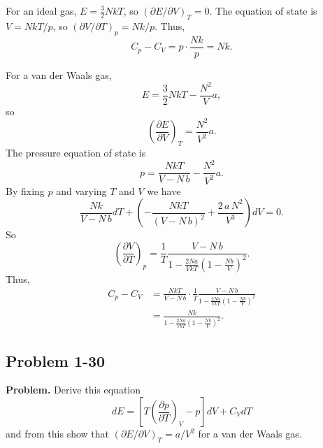 \documentclass[twocolumn, 10pt]{article}
\numberwithin{equation}{section}
\newenvironment{problem}
{\par\medskip \color{problemblue}
  \textbf{Problem. }\ignorespaces}
{\medskip}
\newenvironment{solution}[1][\empty]
{\par\medskip\sffamily
  \textbf{\ifx\empty#1{Solution.}\relax\else{#1}\fi} \ignorespaces}
{\medskip}
\begin{document}
\begin{solution}
For an ideal gas,
$E = \frac 3 2 N k T$,
so
$( \partial E / \partial V )_T = 0$.
The equation of state is
$V = NkT/p$,
so $(\partial V/\partial T)_p = Nk/p$.
Thus,
$$
C_p - C_V = p \cdot \frac{Nk}{p} = N k.
$$

For a van der Waals gas,
$$
E = \frac{3}{2} N k T  - \frac{ N^2 } { V } a,
$$
so
$$
\left( \frac{ \partial E } {\partial V } \right)_T = \frac{ N^2 } { V^2 } a.
$$
The pressure equation of state is
$$
p = \frac{ N k T } { V - N \, b } - \frac{N^2 }{ V^2 } a.
$$
By fixing $p$ and varying $T$ and $V$ we have
$$
\frac{ N k } { V - N \, b } dT
+
\left(
- \frac{ N k T } { (V - N \, b)^2 }
+ \frac{ 2 \, a \, N^2 } { V^3 } \right) dV = 0.
$$
So
$$
\left(
\frac{ \partial V } { \partial T }
\right)_p
=
\frac{1}{T} \frac{ V - N \, b }
{1 - \frac{ 2 N a }{ V k T } \left(1 - \frac{N b}{V} \right)^2 }
.
$$
Thus,
\begin{align*}
C_p - C_V
  &=
\frac{ N k T } { V - N \, b } \cdot
\frac{1}{T} \frac{ V - N \, b }
{1 - \frac{ 2 N a }{ V k T } \left(1 - \frac{N b}{V} \right)^2 }
  \\
  &=
\frac{ N k }
{1 - \frac{ 2 N a }{ V k T } \left(1 - \frac{N b}{V} \right)^2 }
.
\end{align*}

\end{solution}




\subsection{Problem 1-30}

\begin{problem}
  Derive this equation
  \begin{equation}
  dE
  =
  \left[ T \left( \frac{ \partial p} {\partial T } \right)_V - p \right]
  dV + C_V dT
    \label{eq:dE_VT}
  \end{equation}
  and from this show that $(\partial E/\partial V)_T = a/V^2$
  for a van der Waals gas.
\end{problem}
\end{document}
